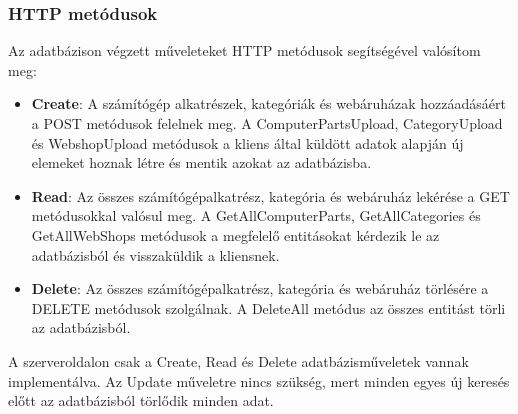 \documentclass[
]{thesis-ekf}
\theoremstyle{definition}
\theoremstyle{remark}
\begin{document}
\subsubsection{HTTP metódusok}
Az adatbázison végzett műveleteket HTTP metódusok segítségével valósítom meg:
\begin{itemize}
	\item \textbf{Create}: A számítógép alkatrészek, kategóriák és webáruházak hozzáadásáért a POST metódusok felelnek meg. A ComputerPartsUpload, CategoryUpload és WebshopUpload metódusok a kliens által küldött adatok alapján új elemeket hoznak létre és mentik azokat az adatbázisba.

	\item \textbf{Read}: Az összes számítógépalkatrész, kategória és webáruház lekérése a GET metódusokkal valósul meg. A GetAllComputerParts, GetAllCategories és GetAllWebShops metódusok a megfelelő entitásokat kérdezik le az adatbázisból és visszaküldik  a kliensnek.

	\item \textbf{Delete}: Az összes számítógépalkatrész, kategória és webáruház törlésére a DELETE metódusok szolgálnak. A DeleteAll metódus az összes entitást törli az adatbázisból.
\end{itemize}
A szerveroldalon csak a Create, Read és Delete adatbázisműveletek vannak implementálva. Az Update műveletre nincs szükség, mert minden egyes új keresés előtt az adatbázisból törlődik minden adat.
\end{document}
